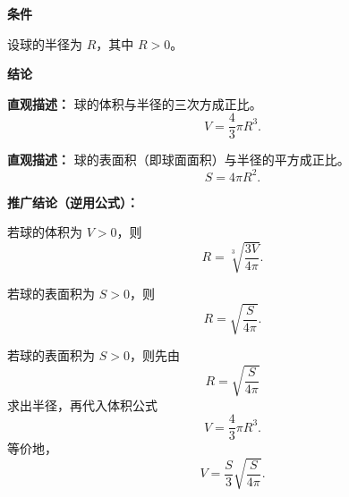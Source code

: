 \begin{statementbox}
\textbf{\textcolor{CStatement}{条件}}
\begin{description}[style=nextline, leftmargin=2.8em, labelsep=0.5em, itemsep=0.35em]
\item[\textbf{\textcolor{CStatement}{条件1（球与半径）：}}] 设球的半径为 $R$，其中 $R>0$。
\end{description}

\textbf{\textcolor{CStatement}{结论}}
\begin{description}[style=nextline, leftmargin=2.8em, labelsep=0.5em, itemsep=0.45em]
\item[\textbf{\textcolor{CStatement}{结论一（体积公式）：}}]
\textbf{\textcolor{CStatement}{直观描述：}} 球的体积与半径的三次方成正比。
\[
V = \frac{4}{3}\pi R^{3} .
\]

\item[\textbf{\textcolor{CStatement}{结论二（表面积公式）：}}]
\textbf{\textcolor{CStatement}{直观描述：}} 球的表面积（即球面面积）与半径的平方成正比。
\[
S = 4\pi R^{2} .
\]
\end{description}

\medskip
\textbf{\textcolor{CStatement}{推广结论（逆用公式）：}}
\begin{description}[style=nextline, leftmargin=2.8em, labelsep=0.5em, itemsep=0.45em]
\item[\textbf{（已知体积求半径）：}]
若球的体积为 $V>0$，则
\[
R = \sqrt[3]{\frac{3V}{4\pi}} .
\]
\item[\textbf{（已知表面积求半径）：}]
若球的表面积为 $S>0$，则
\[
R = \sqrt{\frac{S}{4\pi}} .
\]
\item[\textbf{（已知表面积求体积）：}]
若球的表面积为 $S>0$，则先由
\[
R=\sqrt{\frac{S}{4\pi}}
\]
求出半径，再代入体积公式
\[
V=\frac{4}{3}\pi R^{3}.
\]
等价地，
\[
V=\frac{S}{3}\sqrt{\frac{S}{4\pi}}.
\]
\end{description}
\end{statementbox}
